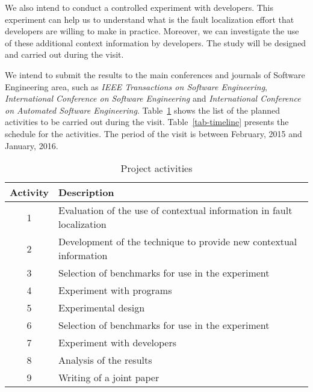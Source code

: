 \documentclass[12pt,a4paper,espaco=umemeio,noindentfirst,oneside,openany,tocpage=plain,pnumromarab,ruledheader,time,anapcustomindent]{sty/abnt}
\begin{document}
We also intend to conduct a controlled experiment with developers. This experiment can help us to understand what is the fault localization effort that developers 
are willing to make in practice. Moreover, we can investigate the use of these additional context information by developers. The study will be designed and carried out 
during the visit. 

We intend to submit the results to the main conferences and journals of Software Engineering area, such as \textit{IEEE Transactions on Software Engineering}, 
\textit{International Conference on Software Engineering} and \textit{International Conference on Automated Software Engineering}. Table~\ref{tab-activities} shows 
the list of the planned activities to be carried out during the visit. Table~\ref{tab-timeline} presents the schedule for the activities. The period of the visit 
is between February, 2015 and January, 2016.

\begin{table}[h]
\caption{Project activities}
\label{tab-activities}
\centering
\begin{tabular}{|c|l|}
\hline Activity & Description \\
\hline 1 & Evaluation of the use of contextual information in fault localization\\
\hline 2 & Development of the technique to provide new contextual information\\
\hline 3 & Selection of benchmarks for use in the experiment\\
\hline 4 & Experiment with programs\\
\hline 5 & Experimental design\\
\hline 6 & Selection of benchmarks for use in the experiment\\
\hline 7 & Experiment with developers\\
\hline 8 & Analysis of the results\\
\hline 9 & Writing of a joint paper\\
\hline
\end{tabular}
\end{table}
\end{document}
